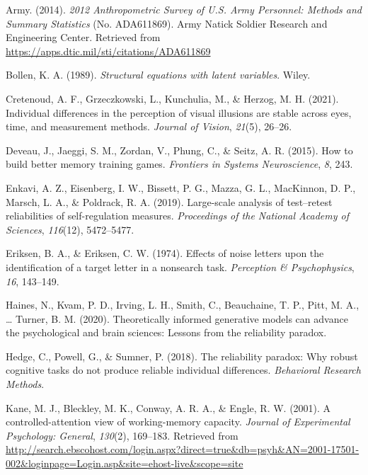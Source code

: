 \documentclass[
  ,man]{apa6}
\newlength{\cslhangindent}
\newlength{\cslentryspacingunit} %
\newenvironment{CSLReferences}[2] %
 {%
  \setlength{\parindent}{0pt}
  \ifodd #1
  \let\oldpar\par
  \def\par{\hangindent=\cslhangindent\oldpar}
  \fi
  \setlength{\parskip}{#2\cslentryspacingunit}
 }%
 {}
\begin{document}
\hypertarget{refs}{}
\begin{CSLReferences}{1}{0}
\leavevmode{}%
Army. (2014). \emph{2012 {Anthropometric Survey} of {U}.{S}. {Army Personnel}: {Methods} and {Summary Statistics}} (No. ADA611869). {Army Natick Soldier Research and Engineering Center}. Retrieved from \url{https://apps.dtic.mil/sti/citations/ADA611869}

\leavevmode{}%
Bollen, K. A. (1989). \emph{Structural equations with latent variables}. {Wiley}.

\leavevmode{}%
Cretenoud, A. F., Grzeczkowski, L., Kunchulia, M., \& Herzog, M. H. (2021). Individual differences in the perception of visual illusions are stable across eyes, time, and measurement methods. \emph{Journal of Vision}, \emph{21}(5), 26--26.

\leavevmode{}%
Deveau, J., Jaeggi, S. M., Zordan, V., Phung, C., \& Seitz, A. R. (2015). How to build better memory training games. \emph{Frontiers in Systems Neuroscience}, \emph{8}, 243.

\leavevmode{}%
Enkavi, A. Z., Eisenberg, I. W., Bissett, P. G., Mazza, G. L., MacKinnon, D. P., Marsch, L. A., \& Poldrack, R. A. (2019). Large-scale analysis of test--retest reliabilities of self-regulation measures. \emph{Proceedings of the National Academy of Sciences}, \emph{116}(12), 5472--5477.

\leavevmode{}%
Eriksen, B. A., \& Eriksen, C. W. (1974). Effects of noise letters upon the identification of a target letter in a nonsearch task. \emph{Perception \& Psychophysics}, \emph{16}, 143--149.

\leavevmode{}%
Haines, N., Kvam, P. D., Irving, L. H., Smith, C., Beauchaine, T. P., Pitt, M. A., \ldots{} Turner, B. M. (2020). Theoretically informed generative models can advance the psychological and brain sciences: {Lessons} from the reliability paradox.

\leavevmode{}%
Hedge, C., Powell, G., \& Sumner, P. (2018). The reliability paradox: {Why} robust cognitive tasks do not produce reliable individual differences. \emph{Behavioral Research Methods}.

\leavevmode{}%
Kane, M. J., Bleckley, M. K., Conway, A. R. A., \& Engle, R. W. (2001). A controlled-attention view of working-memory capacity. \emph{Journal of Experimental Psychology: General}, \emph{130}(2), 169--183. Retrieved from \url{http://search.ebscohost.com/login.aspx?direct=true\&db=psyh\&AN=2001-17501-002\&loginpage=Login.asp\&site=ehost-live\&scope=site}


\end{CSLReferences}
\end{document}
